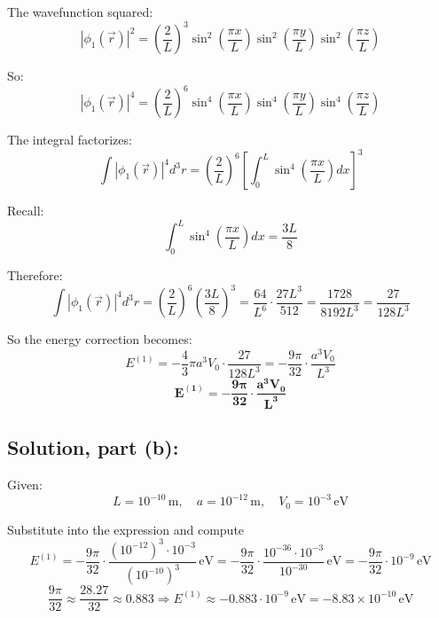 \documentclass[12pt]{article}
\begin{document}
        The wavefunction squared:
        \[
            |\phi_1(\vec{r})|^2 = \left( \frac{2}{L} \right)^3 \sin^2\left( \frac{\pi x}{L} \right)\sin^2\left( \frac{\pi y}{L} \right)\sin^2\left( \frac{\pi z}{L} \right)
        \]
        
        So:
        \[
            |\phi_1(\vec{r})|^4 = \left( \frac{2}{L} \right)^6 \sin^4\left( \frac{\pi x}{L} \right)\sin^4\left( \frac{\pi y}{L} \right)\sin^4\left( \frac{\pi z}{L} \right)
        \]
        
        The integral factorizes:
        \[
            \int |\phi_1(\vec{r})|^4 d^3r = \left( \frac{2}{L} \right)^6 \left[ \int_0^L \sin^4\left( \frac{\pi x}{L} \right) dx \right]^3
        \]
        
        Recall:
        \[
            \int_0^L \sin^4\left( \frac{\pi x}{L} \right) dx = \frac{3L}{8}
        \]
        
        Therefore:
        \[
            \int |\phi_1(\vec{r})|^4 d^3r = \left( \frac{2}{L} \right)^6 \left( \frac{3L}{8} \right)^3
            = \frac{64}{L^6} \cdot \frac{27L^3}{512} = \frac{1728}{8192L^3} = \frac{27}{128 L^3}
        \]
        
        So the energy correction becomes:
        \[
            E^{(1)} = -\frac{4}{3} \pi a^3 V_0 \cdot \frac{27}{128 L^3} = -\frac{9\pi}{32} \cdot \frac{a^3 V_0}{L^3}
        \]
        \[
            \boldsymbol{\boxed{ E^{(1)} = -\frac{9\pi}{32} \cdot \frac{a^3 V_0}{L^3} }}
        \]

    \subsection{Solution, part (b):}
        Given:
        \[
            L = 10^{-10} \, \text{m}, \quad a = 10^{-12} \, \text{m}, \quad V_0 = 10^{-3} \, \text{eV}
        \]
        
        Substitute into the expression and compute
        \[
            E^{(1)} = -\frac{9\pi}{32} \cdot \frac{(10^{-12})^3 \cdot 10^{-3}}{(10^{-10})^3} \, \text{eV}
            = -\frac{9\pi}{32} \cdot \frac{10^{-36} \cdot 10^{-3}}{10^{-30}} \, \text{eV}
            = -\frac{9\pi}{32} \cdot 10^{-9} \, \text{eV}
        \]
        \[
            \frac{9\pi}{32} \approx \frac{28.27}{32} \approx 0.883
            \Rightarrow E^{(1)} \approx -0.883 \cdot 10^{-9} \, \text{eV} = \boxed{ -8.83 \times 10^{-10} \, \text{eV} }
        \]
    
\end{document}
